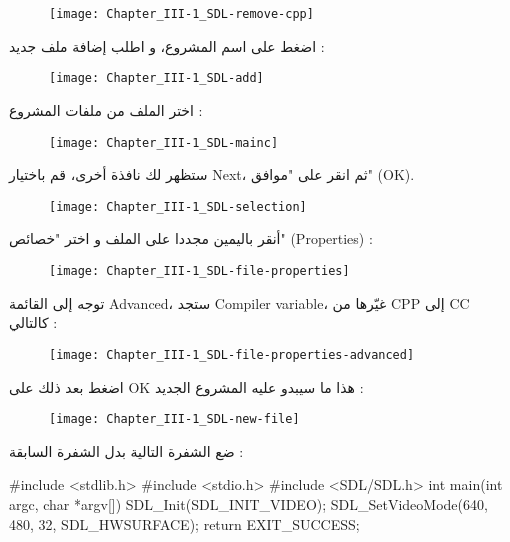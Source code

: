 \begin{tcolorbox}[breakable,title=ملاحظات مترجمة الكتاب, colback=orange!20, colframe=orange!70, fontupper=\footnotesize, coltitle=white, fonttitle=\normalsize, attach title]
\begin{figure}[H]
	\centering
	\texttt{[image: Chapter\_III-1\_SDL-remove-cpp]}
\end{figure}

اضغط على اسم المشروع، و اطلب إضافة ملف جديد :

\begin{figure}[H]
	\centering
	\texttt{[image: Chapter\_III-1\_SDL-add]}
\end{figure}

اختر الملف
من ملفات المشروع :

\begin{figure}[H]
	\centering
	\texttt{[image: Chapter\_III-1\_SDL-mainc]}
\end{figure}

ستظهر لك نافذة أخرى، قم باختيار
\textenglish{Next}،
ثم انقر على "موافق"
(\textenglish{OK}).

\begin{figure}[H]
	\centering
	\texttt{[image: Chapter\_III-1\_SDL-selection]}
\end{figure}

أنقر باليمين مجددا على الملف 
و اختر "خصائص" 
(\textenglish{Properties}) :

\begin{figure}[H]
	\centering
	\texttt{[image: Chapter\_III-1\_SDL-file-properties]}
\end{figure}

توجه إلى القائمة
\textenglish{Advanced}،
ستجد
\textenglish{Compiler variable}،
غيّرها من
\textenglish{CPP}
إلى
\textenglish{CC}
كالتالي :

\begin{figure}[H]
	\centering
	\texttt{[image: Chapter\_III-1\_SDL-file-properties-advanced]}
\end{figure}

اضغط بعد ذلك على
\textenglish{OK}
هذا ما سيبدو عليه المشروع الجديد :

\begin{figure}[H]
	\centering
	\texttt{[image: Chapter\_III-1\_SDL-new-file]}
\end{figure}

ضع الشفرة التالية بدل الشفرة السابقة :

\begin{Csource}
#include <stdlib.h> 
#include <stdio.h> 
#include <SDL/SDL.h>
int main(int argc, char *argv[]) 
{ 
	SDL_Init(SDL_INIT_VIDEO); 
	SDL_SetVideoMode(640, 480, 32, SDL_HWSURFACE); 
	return EXIT_SUCCESS; 
}
\end{Csource}


\end{tcolorbox}
